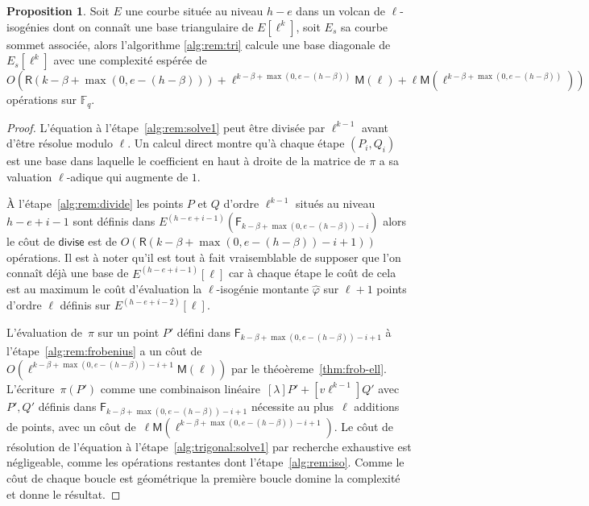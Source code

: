 \documentclass[10pt,a4paper]{book}
\theoremstyle{plain}
\theoremstyle{definition}
\theoremstyle{definition}
\theoremstyle{definition}
\newtheorem{prop}[thm]{Proposition}
\theoremstyle{definition}
\theoremstyle{remark}
\theoremstyle{remark}
\theoremstyle{definition}
\begin{document}
\begin{prop}
\label{pro:alg:rem:tri}
Soit $E$ une courbe située au niveau $h-e$ dans un volcan de $\ell$-isogénies 
dont on connaît une base triangulaire de $E[\ell^k]$, soit $E_s$ sa courbe 
sommet associée, alors l'algorithme \ref{alg:rem:tri} calcule une base 
diagonale de $E_s[\ell^k]$ avec une complexité espérée de $O( \mathsf{R}(k-
\beta+\max(0,e-(h-\beta))) + \ell^{k-\beta+\max(0,e-(h-\beta))}\mathsf{M}(\ell) 
+ \ell\mathsf{M}(\ell^{k-\beta+\max(0,e-(h-\beta))}))$ opérations sur 
$\mathbb{F}_q$.
\end{prop}

\begin{proof}
L'équation à l'étape~\ref{alg:rem:solve1} peut être divisée par $\ell^{k-1}$
avant d'être résolue modulo $\ell$. Un calcul direct montre qu'à chaque étape 
$(P_i,Q_i)$ est une base dans laquelle le coefficient en haut à droite de la 
matrice de $\pi$ a sa valuation $\ell$-adique qui augmente de $1$. 


\`A l'étape~\ref{alg:rem:divide} les points $P$ et $Q$ d'ordre $\ell^{k-1}$ 
situés au niveau $h-e+i-1$ sont définis dans $E^{(h-e+i-1)}(\mathsf{F}_{k-\beta
+\max(0,e-(h-\beta))-i})$ alors le côut de $\mathsf{divise}$
 est de $O(\mathsf{R}(k-\beta+\max(0,e-(h-\beta))-i+1))$ opérations.
 Il est à noter qu'il est tout à fait vraisemblable de supposer que l'on 
 connaît déjà une base de $E^{(h-e+i-1)}[\ell]$ car à chaque étape le coût de cela
 est au maximum le coût d'évaluation la $\ell$-isogénie montante 
 $\widehat{\varphi}$ sur $\ell+1$ points d'ordre $\ell$ définis sur 
 $E^{(h-e+i-2)}[\ell]$.

  L'évaluation de~$\pi$ sur un point $P'$ défini dans 
  $\mathsf{F}_{k-\beta+\max(0,e-(h-\beta))-i+1}$ à l'étape~\ref{alg:rem:frobenius} a un côut
  de~$O(\ell^{k-\beta+\max(0,e-(h-\beta))-i+1}\mathsf{M}(\ell))$ par le théoèreme~\ref{thm:frob-ell}.
  L'écriture~$\pi(P')$ comme une combinaison linéaire~$[\lambda] P' + [v\ell^{k-1}] Q'$ 
  avec $P',Q'$ définis dans $\mathsf{F}_{k-\beta+\max(0,e-(h-\beta))-i+1}$  nécessite au plus~$\ell$
  additions de points, avec un côut de~$\ell \mathsf{M}(\ell^{k-\beta+\max(0,e-(h-\beta))-i+1})$.
  Le côut de résolution de l'équation à l'étape~\ref{alg:trigonal:solve1}
  par recherche exhaustive est négligeable, comme les 
  opérations restantes dont l'étape~\ref{alg:rem:iso}.
  Comme le côut de chaque boucle est géométrique
  la première boucle domine la complexité et donne le résultat.
\end{proof}
\end{document}
